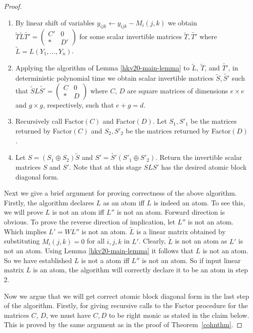 \begin{proof}
\begin{enumerate}
%
%
%
%
%
%
  
\item By linear shift of variables $y_{ijk} \leftarrow y_{ijk} -
  M_i(j,k)$ we obtain $\tilde{T} \tilde{L} \tilde{T'} = \left(
\begin{array}{cc}
C' & 0 \\
* & D'
\end{array}
\right)$    
for some scalar invertible matrices $\tilde{T}, \tilde{T'}$ where
$\tilde{L} = L( Y_1, \ldots, Y_n)$.

\item Applying the algorithm of Lemma \ref{hkv20-main-lemma} to
  $\tilde{L}$, $\tilde{T}$, and $\tilde{T'}$, in deterministic
  polynomial time we obtain scalar invertible matrices $\tilde{S}, \tilde{S'}$ such
  that $\tilde{S}L\tilde{S'} = \left(
\begin{array}{cc}
C & 0 \\
* & D
\end{array}
\right) $
where $C$, $D$ are square matrices of dimensions $e \times e$ and $g
\times g$, respectively, such that $e+g = d$.

\item Recursively call Factor$(C)$ and Factor$(D)$. Let $S_1, S'_1$ be
  the matrices returned by Factor$(C)$ and $S_2, S'_2$ be the matrices
  returned by Factor$(D)$.

\item Let $S =(S_1 \oplus S_2)\tilde{S}$ and $S' = \tilde{S'}(S'_1
  \oplus S'_2)$. Return the invertible scalar matrices $S$ and
  $S'$. Note that at this stage $SLS'$ has the desired atomic block
  diagonal form.
\end{enumerate}

Next we give a brief argument for proving correctness of the above
algorithm. Firstly, the algorithm declares $L$ as an atom iff $L$ is
indeed an atom. To see this, we will prove $L$ is not an atom iff
$L''$ is not an atom. Forward direction is obvious. To prove the
reverse direction of implication, let $L''$ is not an atom. Which
implies $L' = W L''$ is not an atom. $\tilde{L}$ is a linear matrix
obtained by substituting $M_i(j,k)=0$ for all $i,j,k$ in
$L'$. Clearly, $\tilde{L}$ is not an atom as $L'$ is not an
atom. Using Lemma \ref{hkv20-main-lemma} it follows that $L$ is not an
atom. So we have established $L$ is not a atom iff $L''$ is not an
atom. So if input linear matrix $L$ is an atom, the algorithm will
correctly declare it to be an atom in step 2.

Now we argue that we will get correct atomic block diagonal form in
the last step of the algorithm. Firstly, for giving recursive calls to
the Factor procedure for the matrices $C$, $D$, we must have $C, D$ to
be right monic as stated in the claim below. This is proved by the
same argument as in the proof of Theorem~\ref{cohnthm}.


\end{proof}
